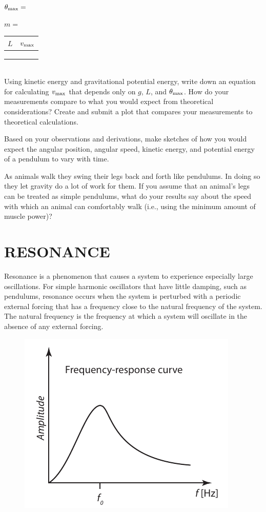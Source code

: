 \documentclass[11pt,letterpaper]{article}
\begin{document}
$\theta_{\rm{max}}=$

$m=$

\begin{tabularx}{\linewidth}{|Y|Y|}
\hline
$L$ & $v_{\rm{max}}$ \\
\hline &\\
\hline &\\
\hline &\\
\hline
\end{tabularx}\\

Using kinetic energy and gravitational potential energy, write down an equation for calculating $v_{\rm{max}}$ that depends only on $g$, $L$, and $\theta_{\rm{max}}$. How do your measurements compare to what you would expect from theoretical considerations? Create and submit a plot that compares your measurements to theoretical calculations.
\vspace{4cm}

Based on your observations and derivations, make sketches of how you would expect the angular position, angular speed, kinetic energy, and potential energy of a pendulum to vary with time.

As animals walk they swing their legs back and forth like pendulums. In doing so they let gravity do a lot of work for them. If you assume that an animal's legs can be treated as simple pendulums, what do your results say about the speed with which an animal can comfortably walk (i.e., using the minimum amount of muscle power)?



\section{RESONANCE}
Resonance is a phenomenon that causes a system to experience especially large oscillations. For simple harmonic oscillators that have little damping, such as pendulums, resonance occurs when the system is perturbed with a periodic external forcing that has a frequency close to the natural frequency of the system. The natural frequency is the frequency at which a system will oscillate in the absence of any external forcing.

\begin{figure}[h]
\begin{center}
\includegraphics[]{./resonance}
\end{center}
\end{figure}
\end{document}
